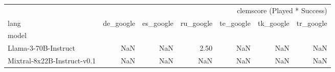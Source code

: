 \begin{tabular}{lrrrrrr}
\toprule
 & \multicolumn{6}{r}{clemscore (Played * Success)} \\
lang & de_google & es_google & ru_google & te_google & tk_google & tr_google \\
model &  &  &  &  &  &  \\
\midrule
Llama-3-70B-Instruct & NaN & NaN & 2.50 & NaN & NaN & NaN \\
Mixtral-8x22B-Instruct-v0.1 & NaN & NaN & NaN & NaN & NaN & NaN \\
\bottomrule
\end{tabular}
